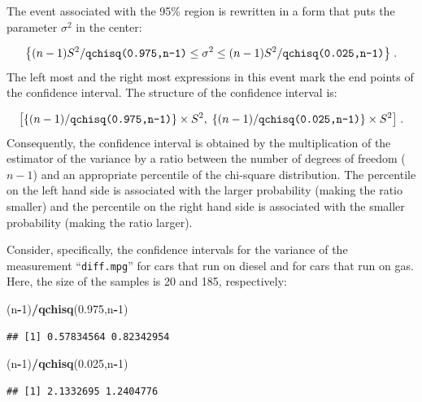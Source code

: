 \documentclass[]{krantz}
\makeatletter
\newenvironment{Shaded}{\begin{snugshade}}{\end{snugshade}}
\newcommand{\KeywordTok}[1]{\textcolor[rgb]{0.13,0.29,0.53}{\textbf{#1}}}
\newcommand{\DecValTok}[1]{\textcolor[rgb]{0.00,0.00,0.81}{#1}}
\newcommand{\FloatTok}[1]{\textcolor[rgb]{0.00,0.00,0.81}{#1}}
\newcommand{\OperatorTok}[1]{\textcolor[rgb]{0.81,0.36,0.00}{\textbf{#1}}}
\newcommand{\NormalTok}[1]{#1}
\newenvironment{kframe}{%
\medskip{}
\setlength{\fboxsep}{.8em}
 \def\at@end@of@kframe{}%
 \ifinner\ifhmode%
  \def\at@end@of@kframe{\end{minipage}}%
  \begin{minipage}{\columnwidth}%
 \fi\fi%
 \def\FrameCommand##1{\hskip\@totalleftmargin \hskip-\fboxsep
 \colorbox{shadecolor}{##1}\hskip-\fboxsep
     \hskip-\linewidth \hskip-\@totalleftmargin \hskip\columnwidth}%
 \MakeFramed {\advance\hsize-\width
   \@totalleftmargin\z@ \linewidth\hsize
   \@setminipage}}%
 {\par\unskip\endMakeFramed%
 \at@end@of@kframe}
\renewenvironment{Shaded}{\begin{kframe}}{\end{kframe}}
\theoremstyle{definition}
\theoremstyle{definition}
\theoremstyle{definition}
\theoremstyle{remark}
\makeatother
\begin{document}
The event associated with the 95\% region is rewritten in a form that
puts the parameter \(\sigma^2\) in the center:

\[\big\{(n-1)S^2/\mbox{\texttt{qchisq(0.975,n-1)}} \leq  \sigma^2  \leq (n-1)S^2/\mbox{\texttt{qchisq(0.025,n-1)}}\big\}\;.\]
The left most and the right most expressions in this event mark the end
points of the confidence interval. The structure of the confidence
interval is:

\[\big[\{(n-1)/\mbox{\texttt{qchisq(0.975,n-1)}}\}\times S^2,\;\{(n-1)/\mbox{\texttt{qchisq(0.025,n-1)}}\}\times S^2\big]\;.\]
Consequently, the confidence interval is obtained by the multiplication
of the estimator of the variance by a ratio between the number of
degrees of freedom (\(n-1\)) and an appropriate percentile of the
chi-square distribution. The percentile on the left hand side is
associated with the larger probability (making the ratio smaller) and
the percentile on the right hand side is associated with the smaller
probability (making the ratio larger).

Consider, specifically, the confidence intervals for the variance of the
measurement ``\texttt{diff.mpg}'' for cars that run on diesel and for
cars that run on gas. Here, the size of the samples is 20 and 185,
respectively:

\begin{Shaded}
\begin{Highlighting}[]
\NormalTok{(n}\OperatorTok{-}\DecValTok{1}\NormalTok{)}\OperatorTok{/}\KeywordTok{qchisq}\NormalTok{(}\FloatTok{0.975}\NormalTok{,n}\OperatorTok{-}\DecValTok{1}\NormalTok{)}
\end{Highlighting}
\end{Shaded}

\begin{verbatim}
## [1] 0.57834564 0.82342954
\end{verbatim}

\begin{Shaded}
\begin{Highlighting}[]
\NormalTok{(n}\OperatorTok{-}\DecValTok{1}\NormalTok{)}\OperatorTok{/}\KeywordTok{qchisq}\NormalTok{(}\FloatTok{0.025}\NormalTok{,n}\OperatorTok{-}\DecValTok{1}\NormalTok{)}
\end{Highlighting}
\end{Shaded}

\begin{verbatim}
## [1] 2.1332695 1.2404776
\end{verbatim}
\end{document}
